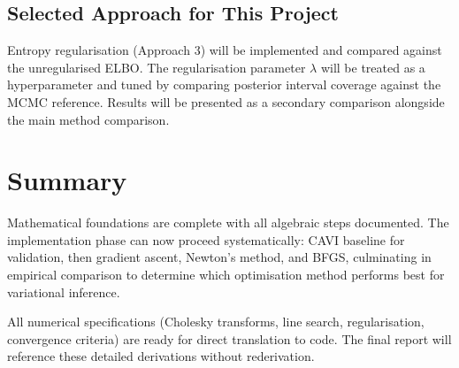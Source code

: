 \documentclass[11pt]{article}
\begin{document}
\subsection*{Selected Approach for This Project}

Entropy regularisation (Approach 3) will be implemented and compared against the unregularised ELBO. The regularisation parameter $\lambda$ will be treated as a hyperparameter and tuned by comparing posterior interval coverage against the MCMC reference. Results will be presented as a secondary comparison alongside the main method comparison.

\section*{Summary}

Mathematical foundations are complete with all algebraic steps documented. The implementation phase can now proceed systematically: CAVI baseline for validation, then gradient ascent, Newton's method, and BFGS, culminating in empirical comparison to determine which optimisation method performs best for variational inference.

All numerical specifications (Cholesky transforms, line search, regularisation, convergence criteria) are ready for direct translation to code. The final report will reference these detailed derivations without rederivation.
\end{document}
